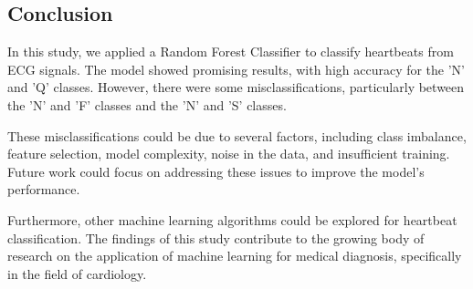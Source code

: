 \documentclass{article}
\begin{document}
\begin{multicols}{2}
\section{Conclusion}

In this study, we applied a Random Forest Classifier to classify heartbeats from ECG signals. The model showed promising results, with high accuracy for the 'N' and 'Q' classes. However, there were some misclassifications, particularly between the 'N' and 'F' classes and the 'N' and 'S' classes. 

These misclassifications could be due to several factors, including class imbalance, feature selection, model complexity, noise in the data, and insufficient training. Future work could focus on addressing these issues to improve the model's performance. 

Furthermore, other machine learning algorithms could be explored for heartbeat classification. The findings of this study contribute to the growing body of research on the application of machine learning for medical diagnosis, specifically in the field of cardiology. 

\end{multicols}
\end{document}
